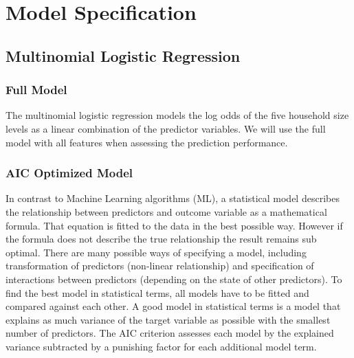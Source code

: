 \documentclass[]{article}
\newenvironment{Shaded}{\begin{snugshade}}{\end{snugshade}}
\newcommand{\DataTypeTok}[1]{\textcolor[rgb]{0.13,0.29,0.53}{#1}}
\newcommand{\DecValTok}[1]{\textcolor[rgb]{0.00,0.00,0.81}{#1}}
\newcommand{\KeywordTok}[1]{\textcolor[rgb]{0.13,0.29,0.53}{\textbf{#1}}}
\newcommand{\NormalTok}[1]{#1}
\newcommand{\OperatorTok}[1]{\textcolor[rgb]{0.81,0.36,0.00}{\textbf{#1}}}
\newcommand{\OtherTok}[1]{\textcolor[rgb]{0.56,0.35,0.01}{#1}}
\newcommand{\StringTok}[1]{\textcolor[rgb]{0.31,0.60,0.02}{#1}}
\begin{document}
\hypertarget{model-specification}{%
\section{Model Specification}\label{model-specification}}

\hypertarget{multinomial-logistic-regression}{%
\subsection{Multinomial Logistic
Regression}\label{multinomial-logistic-regression}}

\hypertarget{full-model}{%
\subsubsection{Full Model}\label{full-model}}

The multinomial logistic regression models the log odds of the five
household size levels as a linear combination of the predictor
variables. We will use the full model with all features when assessing
the prediction performance.

\begin{Shaded}
\end{Shaded}

\hypertarget{aic-optimized-model}{%
\subsubsection{AIC Optimized Model}\label{aic-optimized-model}}

In contrast to Machine Learning algorithms (ML), a statistical model
describes the relationship between predictors and outcome variable as a
mathematical formula. That equation is fitted to the data in the best
possible way. However if the formula does not describe the true
relationship the result remains sub optimal. There are many possible
ways of specifying a model, including transformation of predictors
(non-linear relationship) and specification of interactions between
predictors (depending on the state of other predictors). To find the
best model in statistical terms, all models have to be fitted and
compared against each other. A good model in statistical terms is a
model that explains as much variance of the target variable as possible
with the smallest number of predictors. The AIC criterion assesses each
model by the explained variance subtracted by a punishing factor for
each additional model term.
\end{document}
